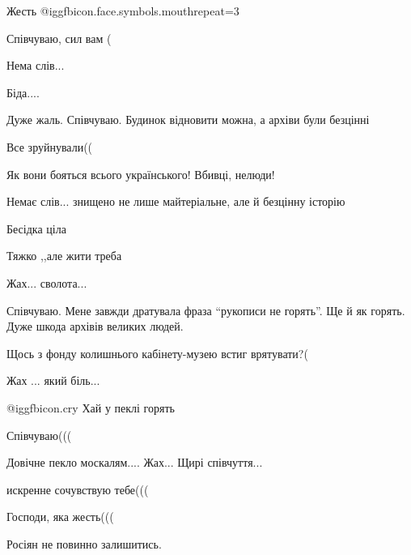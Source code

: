  
 
 
 
 
\zzSecCmt

\begin{itemize} %
Жесть  @igg{fbicon.face.symbols.mouth}{repeat=3} 

Співчуваю, сил вам (

Нема слів...

Біда....

Дуже жаль. Співчуваю. Будинок відновити можна, а архіви були безцінні

Все зруйнували((

Як вони бояться всього українського!
Вбивці, нелюди!

Немає слів... знищено не лише майтеріальне, але й безцінну історію

Бесідка ціла

Тяжко ,,але жити треба

Жах... сволота...

Співчуваю. Мене завжди дратувала фраза \enquote{рукописи не горять}. Ще й як горять.
Дуже шкода архівів великих людей.

Щось з фонду колишнього кабінету-музею встиг врятувати?(

Жах ... який біль...

 @igg{fbicon.cry}  Хай у пеклі горять

Співчуваю(((

Довічне пекло москалям.... Жах... Щирі співчуття...

искренне сочувствую тебе(((

Господи, яка жесть(((

Росіян не повинно залишитись.



\end{itemize}
